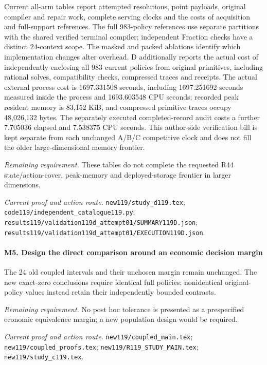 Current all-arm tables report attempted resolutions, point payloads, original compiler and repair work, complete serving clocks and the costs of acquisition and full-support references. The full 983-policy references use separate partitions with the shared verified terminal compiler; independent Fraction checks have a distinct 24-context scope. The masked and packed ablations identify which implementation changes alter overhead. D additionally reports the actual cost of independently enclosing all 983 current policies from original primitives, including rational solves, compatibility checks, compressed traces and receipts. The actual external process cost is 1697.331508 seconds, including 1697.251692 seconds measured inside the process and 1693.603548 CPU seconds; recorded peak resident memory is 83,152 KiB, and compressed primitive traces occupy 48,026,132 bytes. The separately executed completed-record audit costs a further 7.705036 elapsed and 7.538375 CPU seconds. This author-side verification bill is kept separate from each unchanged A/\allowbreak{}B/\allowbreak{}C competitive clock and does not fill the older large-dimensional memory frontier.

\par\emph{Remaining requirement.} These tables do not complete the requested R44 state/\allowbreak{}action-cover, peak-memory and deployed-storage frontier in larger dimensions.

\par\emph{Current proof and action route.} \nolinkurl{new119/study_d119.tex}; \nolinkurl{code119/independent_catalogue119.py}; \nolinkurl{results119/validation119d_attempt01/SUMMARY119D.json}; \nolinkurl{results119/validation119d_attempt01/EXECUTION119D.json}.

\paragraph{M5. Design the direct comparison around an economic decision margin}

The 24 old coupled intervals and their unchosen margin remain unchanged. The new exact-zero conclusions require identical full policies; nonidentical original-policy values instead retain their independently bounded contrasts.

\par\emph{Remaining requirement.} No post hoc tolerance is presented as a prespecified economic equivalence margin; a new population design would be required.

\par\emph{Current proof and action route.} \nolinkurl{new119/coupled_main.tex}; \nolinkurl{new119/coupled_proofs.tex}; \nolinkurl{new119/R119_STUDY_MAIN.tex}; \nolinkurl{new119/study_c119.tex}.

